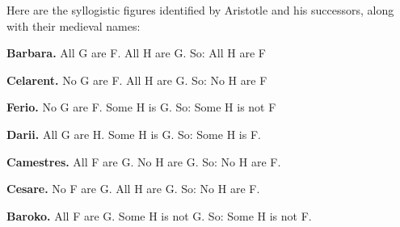 

\begin{practiceproblems}
\problempart
\label{pr.BarbaraEtc}
Here are the syllogistic figures identified by Aristotle and his successors, along with their medieval names:
\begin{earg}
	\item \textbf{Barbara.} All G are F. All H are G. So:  All H are F
	\item[] 
	\item \textbf{Celarent.} No G are F. All H are G. So: No H are F
	\item[] 
	\item \textbf{Ferio.} No G are F. Some H is G. So: Some H is not F
	\item[] 
	\item \textbf{Darii.} All G are H. Some H is G. So: Some H is F.
	\item[] 
	\item \textbf{Camestres.} All F are G. No H are G. So: No H are F.
	\item[] 
	\item \textbf{Cesare.} No F are G. All H are G. So: No H are F.
	\item[] 
	\item \textbf{Baroko.} All F are G. Some H is not G. So: Some H is not F.
	\item[] 

\end{earg}
\end{practiceproblems}
